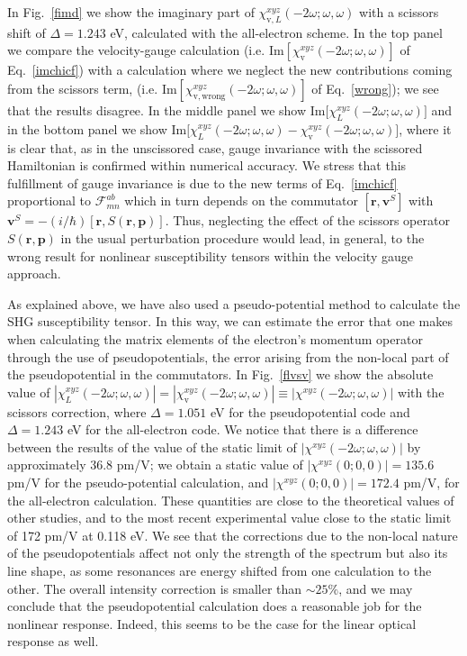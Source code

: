 \documentclass[floatfix,prb,aps,superscriptaddress,11pt]{revtex4}
\begin{document}
In Fig.~\ref{fimd} we show the imaginary part of $\chi _{\mathrm{v},L}^{xyz}(-2\omega;\omega,\omega)$
with a scissors shift of $\Delta=1.243$ eV, calculated with the all-electron
scheme. In the top panel we compare the velocity-gauge calculation
(i.e. $\mathrm{Im}[\chi _{\mathrm{v}}^{xyz}(-2\omega;\omega,\omega)]$ of
Eq.~\eqref{imchicf})
 with
a calculation where we neglect the new contributions coming from the
scissors term, (i.e. $\mathrm{Im}[\chi
_{\mathrm{v,wrong}}^{xyz}(-2\omega;\omega,\omega)]$ of Eq.~\eqref{wrong});
 we see that the results disagree. In the middle
panel we show $\mbox{Im}\lbrack \chi _{L}^{xyz}(-2\omega;\omega,\omega)]$ and in the bottom panel we
show $\mbox{Im}\lbrack \chi _{L}^{xyz}(-2\omega;\omega,\omega)-\chi
_{\mathrm{v}}^{xyz}(-2\omega;\omega,\omega)]$, 
where it is clear that, as in the 
unscissored case, gauge invariance with the scissored Hamiltonian is confirmed 
within numerical accuracy.
We stress that this
fulfillment of gauge invariance is due to the new terms of 
Eq.~\eqref{imchicf} proportional to $\mathcal{F}_{mn}^{ab}$ which in turn
depends on the commutator $[\mathbf{r},\mathbf{v}^{S}]$ with $\mathbf{v}^{S}=-(i/\hbar )[\mathbf{r}%
,S(\mathbf{r},\mathbf{p})]$. Thus, neglecting the effect of the scissors operator 
$S(\mathbf{r},\mathbf{p})$ in the usual perturbation procedure would lead, in general, to
the wrong result for nonlinear susceptibility tensors within the velocity
gauge approach.

As explained above, we have also used a pseudo-potential method to calculate
the SHG susceptibility tensor. In this way, we can estimate the error that
one makes when calculating the matrix elements of the electron's momentum
operator through the use of pseudopotentials, the error arising from the
non-local part of the pseudopotential in the 
commutators.\cite{pulciPRB98,mendozaPRB06} 
In Fig.~\ref{flvsv} we show the absolute value of $
|\chi _{L}^{xyz}(-2\omega;\omega,\omega)|=|\chi
_{\mathrm{v}}^{xyz}(-2\omega;\omega,\omega)|\equiv |\chi
^{xyz}(-2\omega;\omega,\omega)|$
 with the
scissors correction, where $\Delta=1.051$ eV for the pseudopotential code and $
\Delta=1.243$ eV for the all-electron code. We notice that there is a
difference between the results of the value of the static limit of
$|\chi^{xyz}(-2\omega;\omega,\omega)|$
 by approximately 36.8 pm/V; we obtain a static value of $|\chi^{xyz}(0;0,0)|=135.6$ pm/V for the pseudo-potential calculation, and $|\chi^{xyz}(0;0,0)|=172.4$ pm/V, for the all-electron calculation. These quantities
are close to the theoretical values of other studies,\cite{nastosPRB05} and
to the most recent experimental value close to the static limit of 172
pm/V at 0.118 eV.\cite{eyresAPL01} We see that the corrections due to the
non-local nature of the pseudopotentials affect not only the strength of the
spectrum but also its line shape, as some resonances are energy shifted from
one calculation to the other. The overall intensity correction is smaller
than $\sim 25\%$, and we may conclude that the pseudopotential
calculation does a reasonable job for the nonlinear response. Indeed, this
seems to be the case for the linear optical response 
as well.\cite{mendozaPRB06}
\end{document}
